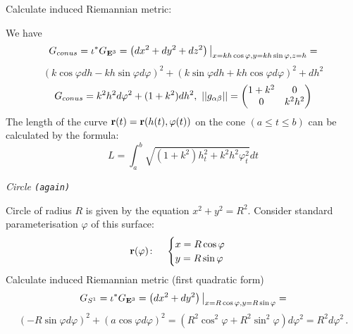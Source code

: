 \documentclass[12pt]{article}
\theoremstyle{theorem}
\numberwithin{equation}{section}
\begin{document}
\medskip

   Calculate induced Riemannian metric:

We have               $$
             G_{conus}=\iota^*G_{{\bf E}^3}=\left(dx^2+dy^2+dz^2\right)
\big\vert_{x=kh\cos\varphi,y=kh\sin\varphi,z=h}=
                      $$
                      $$
                      (k\cos\varphi dh-kh\sin\varphi d\varphi)^2+
             (k\sin\varphi dh+kh\cos\varphi d\varphi)^2+dh^2
                      $$
        \begin{equation}\label{firstquadraticformforconus}
            G_{conus} =k^2h^2d\varphi^2+(1+k^2)dh^2,\,\,
                        ||g_{\alpha\beta}||=
   \begin{pmatrix}
   1+k^2 & 0 \\
   0&  k^2h^2 \\
   \end{pmatrix}
                       \end{equation}
The length of the curve ${\bf r}(t)={\bf r} (h(t), \varphi(t))$ on the
  cone
    $(a\leq t\leq b)$
  can be calculated by the formula:
               \begin{equation}
             L=\int_a^b
             \sqrt{(1+k^2)h_t^2+k^2h^2\varphi_t^2}dt
               \end{equation}




\medskip
 \centerline {\it Circle {\tt (again)}}
  Circle of radius $R$ is given by the equation $x^2+y^2=R^2$. Consider standard parameterisation
  $\varphi$
 of this surface:
\begin{equation*}\label{surfacecircle}
  {\bf r}(\varphi)\colon\quad
  \begin{cases}
  x=R\cos\varphi\\
  y=R\sin\varphi\\
  \end{cases}
\end{equation*}
   Calculate induced Riemannian metric (first quadratic form)
              $$
              G_{S^1}=\iota^*G_{{\bf E}^3}=
    \left(dx^2+dy^2\right)\big\vert_{x=R\cos\varphi,y=R\sin\varphi}=
                      $$
                      $$
                      (-R\sin\varphi d\varphi)^2+
                      (a\cos\varphi d\varphi)^2=
          (R^2\cos^2\varphi+R^2\sin^2\varphi)d\varphi^2=
             R^2 d\varphi^2\,.
             $$
\end{document}

